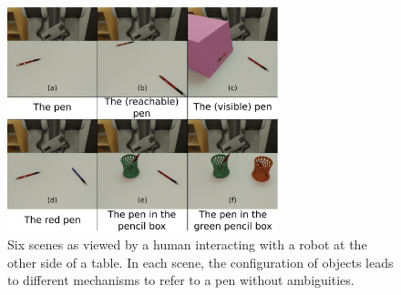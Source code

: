 \documentclass[a4paper,11pt,twoside]{StyleThese}
\begin{document}
\begin{figure}[hbtp]
\centering
\includegraphics[width=0.7\textwidth]{figures/chapter3/pens.png}
\caption{Six scenes as viewed by a human interacting with a robot at the other side of a table. In each scene, the configuration of objects leads to different mechanisms to refer to a pen without ambiguities.}
\label{fig:pens}
\end{figure}
\end{document}
